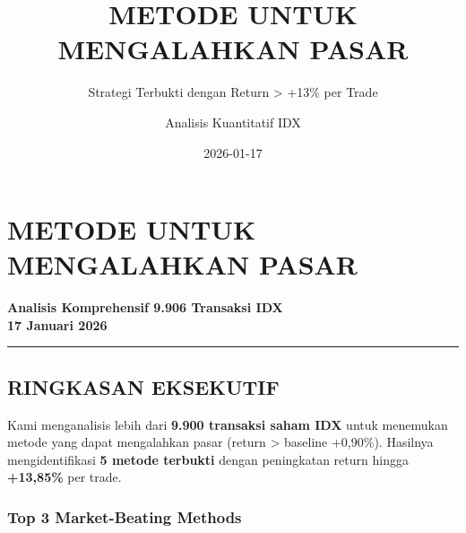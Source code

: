 \documentclass[
  10pt,
  a4paper,
]{article}
\title{METODE UNTUK MENGALAHKAN PASAR}
\subtitle{Strategi Terbukti dengan Return \textgreater{} +13\% per
Trade}
\author{Analisis Kuantitatif IDX}
\date{2026-01-17}
\begin{document}
\maketitle


\color{economist-gray}

\section{METODE UNTUK MENGALAHKAN
PASAR}\label{metode-untuk-mengalahkan-pasar}

\textbf{Analisis Komprehensif 9.906 Transaksi IDX}\\
\textbf{17 Januari 2026}

\begin{center}\rule{0.5\linewidth}{0.5pt}\end{center}

\subsection{RINGKASAN EKSEKUTIF}\label{ringkasan-eksekutif}

Kami menganalisis lebih dari \textbf{9.900 transaksi saham IDX} untuk
menemukan metode yang dapat mengalahkan pasar (return \textgreater{}
baseline +0,90\%). Hasilnya mengidentifikasi \textbf{5 metode terbukti}
dengan peningkatan return hingga \textbf{+13,85\%} per trade.

\subsubsection{Top 3 Market-Beating
Methods}\label{top-3-market-beating-methods}
\end{document}
